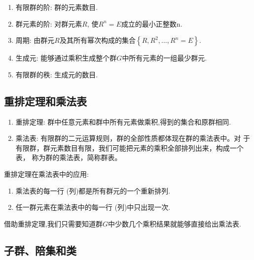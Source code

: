 \documentclass{ctexart}
\begin{document}
\begin{enumerate}
    \item 有限群的阶: 群的元素数目.
    \item 群元素的阶: 对群元素$R$, 使$R^{n}=E$成立的最小正整数n.
    \item 周期: 由群元$R$及其所有幂次构成的集合$\left\{R,R^{2},\ldots,R^{n}
=E \right\}$.
    \item 生成元: 能够通过乘积生成整个群$G$中所有元素的一组最少群元.
    \item 有限群的秩: 生成元的数目.
\end{enumerate}

\subsection{重排定理和乘法表}

\begin{enumerate}
    \item 重排定理:  群中任意元素和群中所有元素做乘积,得到的集合和原群相同.
    \item 乘法表: 有限群的二元运算规则，群的全部性质都体现在群的乘法表中。对
    于有限群，群元素数目有限，我们可能把元素的乘积全部排列出来，构成一个表，
    称为群的乘法表，简称群表。
\end{enumerate}

重排定理在乘法表中的应用:
\begin{enumerate}
    \item 乘法表的每一行 (列)都是所有群元的一个重新排列.
    \item 任一群元素在乘法表中的每一行 (列)中只出现一次.
\end{enumerate}

借助重排定理,我们只需要知道群$G$中少数几个乘积结果就能够直接给出乘法表.

\subsection{子群、陪集和类}
\end{document}
